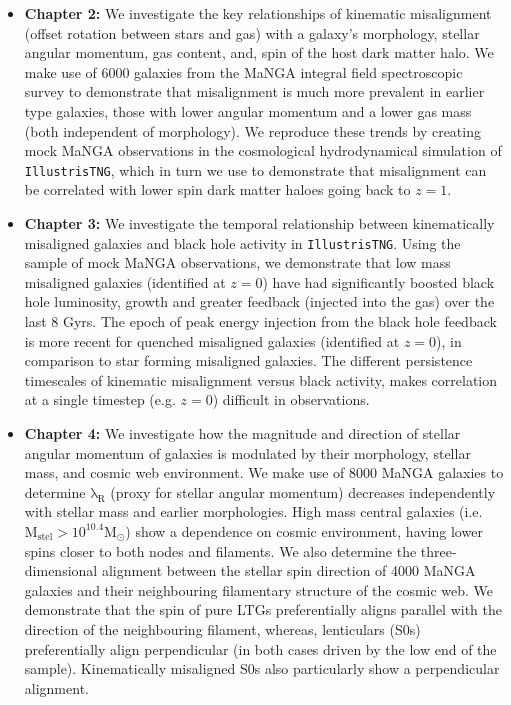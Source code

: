 \begin{itemize}
    \item \textbf{Chapter 2:} We investigate the key relationships of kinematic misalignment (offset rotation between stars and gas) with a galaxy's morphology, stellar angular momentum, gas content, and, spin of the host dark matter halo. We make use of 6000 galaxies from the MaNGA integral field spectroscopic survey to demonstrate that misalignment is much more prevalent in earlier type galaxies, those with lower angular momentum and a lower gas mass (both independent of morphology). We reproduce these trends by creating mock MaNGA observations in the cosmological hydrodynamical simulation of \texttt{IllustrisTNG}, which in turn we use to demonstrate that misalignment can be correlated with lower spin dark matter haloes going back to $z=1$.
    
    \item \textbf{Chapter 3:} We investigate the temporal relationship between kinematically misaligned galaxies and black hole activity in \texttt{IllustrisTNG}. Using the sample of mock MaNGA observations, we demonstrate that low mass misaligned galaxies (identified at $z=0$) have had significantly boosted black hole luminosity, growth and greater feedback (injected into the gas) over the last 8 Gyrs. The epoch of peak energy injection from the black hole feedback is more recent for quenched misaligned galaxies (identified at $z=0$), in comparison to star forming misaligned galaxies. The different persistence timescales of kinematic misalignment versus black activity, makes correlation at a single timestep (e.g. $z=0$) difficult in observations.
    
    \item \textbf{Chapter 4:} We investigate how the magnitude and direction of stellar angular momentum of galaxies is modulated by their morphology, stellar mass, and cosmic web environment. We make use of 8000 MaNGA galaxies to determine $\mathrm{\lambda_R}$ (proxy for stellar angular momentum) decreases independently with stellar mass and earlier morphologies. High mass central galaxies (i.e. $\mathrm{M_{stel} > 10^{10.4}M_{\odot}}$) show a dependence on cosmic environment, having lower spins closer to both nodes and filaments. We also determine the three-dimensional alignment between the stellar spin direction of 4000 MaNGA galaxies and their neighbouring filamentary structure of the cosmic web. We demonstrate that the spin of pure LTGs preferentially aligns parallel with the direction of the neighbouring filament, whereas, lenticulars (S0s) preferentially align perpendicular (in both cases driven by the low end of the sample). Kinematically misaligned S0s also particularly show a perpendicular alignment.
    

\end{itemize}

